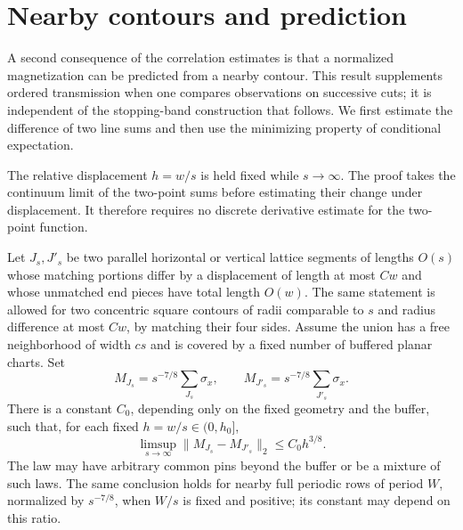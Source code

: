 \section{Nearby contours and prediction}\label{li:section}


A second consequence of the correlation estimates is that a normalized
magnetization can be predicted from a nearby contour. This result
supplements ordered transmission when one compares observations on
successive cuts; it is independent of the stopping-band construction
that follows. We first estimate the difference of two line sums and
then use the minimizing property of conditional expectation.

The relative displacement $h=w/s$ is held fixed while $s\to\infty$.
The proof takes the continuum limit of the two-point sums before
estimating their change under displacement. It therefore requires no
discrete derivative estimate for the two-point function.

\begin{proposition}
\label{tr:line-difference}
Let $J_s,J'_s$ be two parallel horizontal or vertical lattice segments of lengths $O(s)$ whose
matching portions differ by a displacement of length at most $Cw$ and
whose unmatched end pieces have total length $O(w)$. The same statement
is allowed for two concentric square contours of radii comparable to
$s$ and radius difference at most $Cw$, by matching their four sides.
Assume the union has a free neighborhood of width $cs$ and is covered
by a fixed number of buffered planar charts. Set
\[
 M_{J_s}=s^{-7/8}\sum_{J_s}\sigma_x,
 \qquad M_{J'_s}=s^{-7/8}\sum_{J'_s}\sigma_x.
\]
There is a constant $C_0$, depending only on the fixed geometry and the
buffer, such that, for each fixed $h=w/s\in(0,h_0]$,
\begin{equation}
\label{tr:line-difference-eq}
 \limsup_{s\to\infty}
       \|M_{J_s}-M_{J'_s}\|_2\leq C_0 h^{3/8}.
\end{equation}
The law may have arbitrary common pins beyond the buffer or be a mixture
of such laws. The same conclusion holds for nearby full periodic rows of period $W$,
normalized by $s^{-7/8}$, when $W/s$ is fixed and positive; its constant
may depend on this ratio.
\end{proposition}

